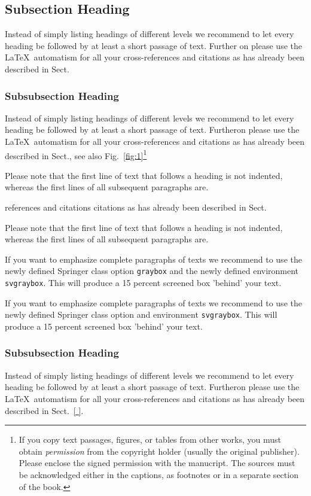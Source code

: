 {\subsection{Subsection Heading}

Instead of simply listing headings of different levels we recommend to let every heading be followed by at least a short passage of text. Further on please use the \LaTeX\ automatism for all your cross-references and citations as has already been described in Sect.~
\subsubsection{Subsubsection Heading}
Instead of simply listing headings of different levels we recommend to let every heading be followed by at least a short passage of text. Furtheron please use the \LaTeX\ automatism for all your cross-references and citations as has already been described in Sect., see also Fig.~\ref{fig:1}\footnote{If you copy text passages, figures, or tables from other works, you must obtain \textit{permission} from the copyright holder (usually the original publisher). Please enclose the signed permission with the manucript. The sources must be acknowledged either in the captions, as footnotes or in a separate section of the book.}

Please note that the first line of text that follows a heading is not indented, whereas the first lines of all subsequent paragraphs are.

references and citations citations as has already been described in Sect.

Please note that the first line of text that follows a heading is not indented, whereas the first lines of all subsequent paragraphs are.

\begin{svgraybox}
If you want to emphasize complete paragraphs of texts we recommend to use the newly defined Springer class option \verb|graybox| and the newly defined environment \verb|svgraybox|. This will produce a 15 percent screened box 'behind' your text.

If you want to emphasize complete paragraphs of texts we recommend to use the newly defined Springer class option and environment \verb|svgraybox|. This will produce a 15 percent screened box 'behind' your text.
\end{svgraybox}


\subsubsection{Subsubsection Heading}
Instead of simply listing headings of different levels we recommend to let every heading be followed by at least a short passage of text. Furtheron please use the \LaTeX\ automatism for all your cross-references and citations as has already been described in Sect.~\ref{ }.

}
